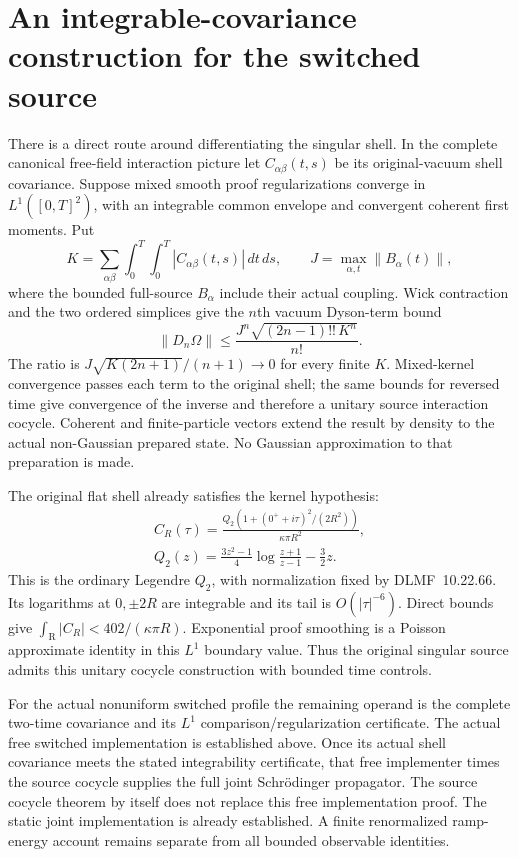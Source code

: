 \section{An integrable-covariance construction for the switched source}
There is a direct route around differentiating the singular shell.
In the complete canonical free-field interaction picture let
$C_{\alpha\beta}(t,s)$ be its original-vacuum shell covariance.
Suppose mixed smooth proof regularizations converge in $L^1([0,T]^2)$,
with an integrable common envelope and convergent coherent first moments.
Put
\[
 K=\sum_{\alpha\beta}\int_0^T\!\int_0^T
                   |C_{\alpha\beta}(t,s)|\,dt\,ds,
 \qquad J=\max_{\alpha,t}\|B_\alpha(t)\|,
\]
where the bounded full-source $B_\alpha$ include their actual coupling.
Wick contraction and the two ordered simplices give the $n$th vacuum
Dyson-term bound
\[
       \|D_n\Omega\|
       \le \frac{J^n\sqrt{(2n-1)!!\,K^n}}{n!}.
\]
The ratio is $J\sqrt{K(2n+1)}/(n+1)\to0$ for every finite $K$.
Mixed-kernel convergence passes each term to the original shell;
the same bounds for reversed time give convergence of the inverse and
therefore a unitary source interaction cocycle. Coherent and finite-particle
vectors extend the result by density to the actual non-Gaussian prepared
state. No Gaussian approximation to that preparation is made.

The original flat shell already satisfies the kernel hypothesis:
\[
 \begin{gathered}
 C_R(\tau)=\frac{Q_2(1+(0^++i\tau)^2/(2R^2))}{\kappa\pi R^2},\\
 Q_2(z)=\frac{3z^2-1}{4}\log\frac{z+1}{z-1}-\frac32z.
 \end{gathered}
\]
This is the ordinary Legendre $Q_2$, with normalization fixed by
DLMF~10.22.66. Its logarithms at $0,\pm2R$ are integrable and its tail is
$O(|\tau|^{-6})$. Direct bounds give
$\int_{\mathrm{R}}|C_R|<402/(\kappa\pi R)$.
Exponential proof smoothing is a Poisson approximate identity in this
$L^1$ boundary value. Thus the original singular source admits this
unitary cocycle construction with bounded time controls.

For the actual nonuniform switched profile the remaining operand is the
complete two-time covariance and its $L^1$ comparison/regularization
certificate. The actual free switched implementation is established above. Once its
actual shell covariance meets the stated integrability certificate, that
free implementer times the source cocycle supplies the full joint
Schr\"odinger propagator. The source cocycle theorem by itself does not
replace this free implementation proof. The static joint implementation
is already established. A finite renormalized ramp-energy
account remains separate from all bounded observable identities.
